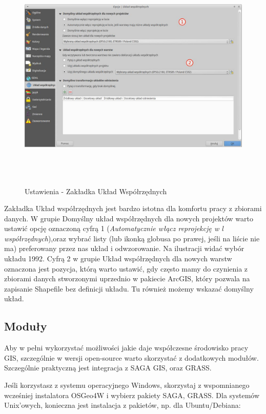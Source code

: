 \documentclass[12pt,a4paper]{book}
\begin{document}
\begin{center}
\begin{figure}
\includegraphics[width=16.997cm,height=11.19cm]{002-zakladka-uklad.jpg}
\caption{Ustawienia - Zakładka Układ Współrzędnych}
\end{figure}
\end{center}
Zakładka Układ współrzędnych jest bardzo istotna dla komfortu pracy z zbiorami danych. W grupie Domyślny układ współrzędnych dla nowych projektów warto ustawić opcję oznaczoną cyfrą 1 (\textit{Automatycznie włącz reprojekcję w l} \textit{współrzędnych}),oraz wybrać listy (lub ikonką globusa po prawej, jeśli na liście nie ma) preferowany przez nas układ i odwzorowanie. Na ilustracji widać wybór układu 1992. Cyfrą 2 w grupie Układ współrzędnych dla nowych warstw oznaczona jest pozycja, którą warto ustawić, gdy często mamy do czynienia z zbiorami danych stworzonymi uprzednio w pakiecie ArcGIS, który pozwala na zapisanie Shapefile bez definicji układu. Tu również możemy wskazać domyślny układ.

\subsection{Moduły}
Aby w pełni wykorzystać możliwości jakie daje współczesne środowisko pracy GIS, szczególnie w wersji open-source warto skorzystać z dodatkowych modułów. Szczególnie praktyczną jest integracja z SAGA GIS, oraz GRASS.

Jeśli korzystasz z systemu operacyjnego Windows, skorzystaj z wspomnianego wcześniej instalatora OSGeo4W i wybierz pakiety SAGA, GRASS. Dla systemów Unix'owych, konieczna jest instalacja z pakietów, np. dla Ubuntu/Debiana:
\end{document}
